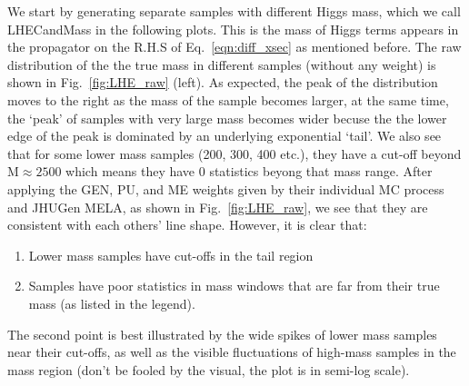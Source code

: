 We start by generating separate samples with different Higgs mass, which we call LHECandMass in the
following plots. This is the mass of Higgs terms appears in the propagator on 
the R.H.S of Eq.~\ref{eqn:diff_xsec} as mentioned before. The raw distribution of the the true mass
in different samples (without any weight) is shown in Fig.~\ref{fig:LHE_raw} (left). As expected, 
the peak of the distribution moves to the right as the mass of the sample becomes larger, at the
same time, the `peak' of samples with very large mass becomes wider becuse the the lower edge
of the peak is dominated by an underlying exponential `tail'. We also see that for some lower mass
samples (200, 300, 400 etc.), they have a cut-off beyond $\mathrm{M}\approx2500$ which means they have 0
statistics beyong that mass range. After applying the GEN, PU, and ME weights given by their
individual MC process and JHUGen MELA, as shown in Fig.~\ref{fig:LHE_raw},
we see that they are consistent with each others' line shape. However, it is clear
that:
\begin{enumerate}[label=(\roman*)]
    \item Lower mass samples have cut-offs in the tail region
    \item Samples have poor statistics in mass windows that are 
        far from their true mass (as listed in the legend).
\end{enumerate}
The second point is best illustrated by the wide spikes of lower mass samples near their cut-offs,
as well as the visible fluctuations of high-mass samples in the mass region (don't be fooled by the 
visual, the plot is in semi-log scale).
